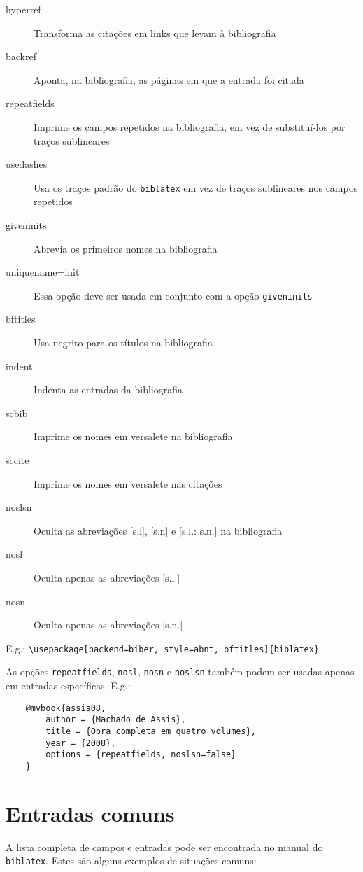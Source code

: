 \documentclass[a4paper]{article}
\begin{document}
\begin{description}
    \item [hyperref] Transforma as citações em links que levam à bibliografia
    \item [backref] Aponta, na bibliografia, as páginas em que a entrada foi citada
    \item [repeatfields] Imprime os campos repetidos na bibliografia, em vez de substituí-los por traços sublineares
    \item [usedashes] Usa os traços padrão do \texttt{biblatex} em vez de traços sublineares nos campos repetidos
    \item [giveninits] Abrevia os primeiros nomes na bibliografia
    \item [uniquename=init] Essa opção deve ser usada em conjunto com a opção \texttt{giveninits}
    \item [bftitles] Usa negrito para os títulos na bibliografia
    \item [indent] Indenta as entradas da bibliografia
    \item [scbib] Imprime os nomes em versalete na bibliografia
    \item [sccite] Imprime os nomes em versalete nas citações
    \item [noslsn] Oculta as abreviações [s.l], [s.n] e [s.l.: s.n.] na bibliografia
    \item [nosl] Oculta apenas as abreviações [s.l.]
    \item [nosn] Oculta apenas as abreviações [s.n.]
\end{description}

E.g.: \verb"\usepackage[backend=biber, style=abnt, bftitles]{biblatex}"

As opções \texttt{repeatfields}, \texttt{nosl}, \texttt{nosn} e \texttt{noslsn} também podem ser usadas apenas em entradas específicas. E.g.:

\begin{verbatim}
    @mvbook{assis08,
        author = {Machado de Assis},
        title = {Obra completa em quatro volumes},
        year = {2008},
        options = {repeatfields, noslsn=false}
    }
\end{verbatim}


	
\clearpage
\section{Entradas comuns}

A lista completa de campos e entradas pode ser encontrada no manual do \texttt{biblatex}. Estes são alguns exemplos de situações comuns:
\end{document}

